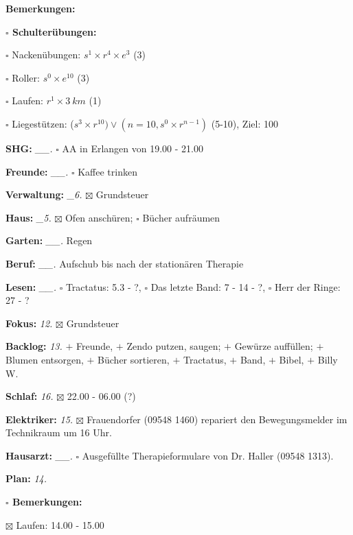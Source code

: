 \documentclass[10pt,a4paper]{article}
\newcommand\prop[1] {{\color {alizarin} {\bf #1}}}             %
\newcommand\opti[1] {{\color {amethyst} {\bf #1}}}             %
\newcommand\mand[1] {{\color {burntorange} {\bf #1}}}          %
\newcommand\topspace{\vskip -15pt \hskip 20pt}
\newcommand\bottomspace{\vskip 4pt}
\newcommand\n[1] { {\sl #1.} \hskip 5pt }
\begin{document}
\begin{mdframed}[style=daystyle]
\begin{labeling}{{\mand {Bemerkungen:}}}
\begin{minipage}{0.75\textwidth}
\begin{labeling}{\prop {$\square$ {Schulterübungen:}}}
      \item[$\square$ Nackenübungen:]   $s^1 \times r^4 \times e^3$ (3)
      \item[$\square$ Roller:]          $s^0 \times e^{10}$ (3)
      \item[$\square$ Laufen:]          $r^1 \times 3\ km$ (1)
      \item[$\square$ Liegestützen:]    ($s^3 \times r^{10}) \vee (n=10, s^0 \times r^{n-1})$ (5-10), Ziel: 100
      \end{labeling}
    \end{minipage}
    \bottomspace        
  \item[{\mand {SHG:}}]          \n{\_\_} $\square$ AA in Erlangen von 19.00 - 21.00
  \item[{\mand {Freunde:}}]      \n{\_\_} $\square$ Kaffee trinken
  \item[{\mand {Verwaltung:}}]    \n{\_6} $\boxtimes$ Grundsteuer
  \item[{\mand {Haus:}}]          \n{\_5} $\boxtimes$ Ofen anschüren; $\square$ Bücher aufräumen
  \item[{\mand {Garten:}}]       \n{\_\_} Regen
  \item[{\mand {Beruf:}}]        \n{\_\_} Aufschub bis nach der stationären Therapie
  \item[{\mand {Lesen:}}]        \n{\_\_} $\square$ Tractatus: 5.3 - ?,
      $\square$ Das letzte Band: 7 - 14 - ?, $\square$ Herr der Ringe: 27 - ?
  \item[{\mand {Fokus:}}]          \n{12} $\boxtimes$ Grundsteuer
  \item[{\mand {Backlog:}}]        \n{13} $+$ Freunde,
    $+$ Zendo putzen, saugen; $+$ Gewürze auffüllen; $+$ Blumen entsorgen, $+$ Bücher sortieren,
    $+$ Tractatus, $+$ Band, $+$ Bibel, $+$ Billy W.
  \item[{\mand {Schlaf:}}]       \n{16} $\boxtimes$ 22.00 - 06.00 (?)
  \item[{\opti {Elektriker:}}]     \n{15} $\boxtimes$ Frauendorfer (09548 1460) repariert den
      Bewegungsmelder im Technikraum um 16 Uhr.
  \item[{\opti {Hausarzt:}}]     \n{\_\_} $\square$ Ausgefüllte Therapieformulare von
    Dr. Haller (09548 1313).
  \item[{\mand {Plan:}}]           \n{14}
    \topspace
    \begin{minipage}{0.75\textwidth}  
      \begin{labeling}{\prop {$\square$ {Bemerkungen:}}} 
        \setlength\itemsep{-3pt}
      \item[$\boxtimes$ Laufen:]      14.00 - 15.00

\end{labeling}
\end{minipage}
\end{labeling}
\end{mdframed}
\end{document}

